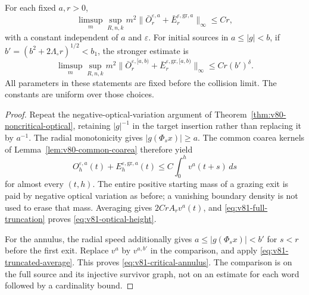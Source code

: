 \begin{theorem}
\label{thm:v81-optical-height}
For each fixed $a,r>0$,
\begin{equation}\label{eq:v81-optical-height}
 \limsup_m\sup_{R,n,k}m^2
       \|\bar O_r^{\varepsilon,a}
                  +\bar E_r^{\varepsilon,\mathrm{gr},a}\|_\infty
                           \le Cr,
\end{equation}
with a constant independent of $a$ and $\varepsilon$.
For initial sources in $a\le |g|<b$, if
$b'=(b^2+2\Lambda_\circ r)^{1/2}<b_1$, the stronger estimate is
\begin{equation}\label{eq:v81-critical-annulus}
 \limsup_m\sup_{R,n,k}m^2
    \|\bar O_r^{\varepsilon,[a,b)}
          +\bar E_r^{\varepsilon,\mathrm{gr},[a,b)}\|_\infty
                      \le Cr(b')^\delta.
\end{equation}
All parameters in these statements are fixed before the collision
limit. The constants are uniform over those choices.
\end{theorem}
\begin{proof}
Repeat the negative-optical-variation argument of
Theorem~\ref{thm:v80-noncritical-optical}, retaining $|g|^{-1}$
in the target insertion rather than replacing it by $a^{-1}$.
The radial monotonicity gives $|g(\Phi_sx)|\ge a$. The common
coarea kernels of Lemma~\ref{lem:v80-common-coarea} therefore yield
\begin{equation}\label{eq:v81-drift-before-limit}
 O_h^{\varepsilon,a}(t)+E_h^{\varepsilon,\mathrm{gr},a}(t)
                            \le C\int_0^h v^a(t+s)\,ds
\end{equation}
for almost every $(t,h)$. The entire positive starting mass of a
grazing exit is paid by negative optical variation as before; a
vanishing boundary density is not used to erase that mass.
Averaging gives $2CrA_rv^a(t)$, and
\eqref{eq:v81-full-truncation} proves \eqref{eq:v81-optical-height}.

For the annulus, the radial speed additionally gives
$a\le |g(\Phi_sx)|<b'$ for $s<r$ before the first exit.
Replace $v^a$ by $v^{a,b'}$ in the comparison, and apply
\eqref{eq:v81-truncated-average}. This proves
\eqref{eq:v81-critical-annulus}. The comparison is on the full
source and its injective survivor graph, not on an estimate for
each word followed by a cardinality bound.
\end{proof}

